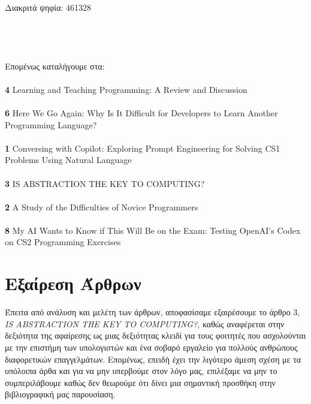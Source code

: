 \documentclass{report}
\begin{document}
\\Διακριτά ψηφία:  461328 \\\\
\\\\\\Επομένως καταλήγουμε στα:\\\\
\textbf4 Learning and Teaching Programming: A Review and Discussion  \\\\
\textbf6  Here We Go Again: Why Is It Difficult for Developers to Learn Another Programming Language?  \\ \\
\textbf1  Conversing with Copilot: Exploring Prompt Engineering for Solving CS1 Problems Using Natural Language  \\\\ 
\textbf3  IS ABSTRACTION THE KEY TO COMPUTING?  \\\\ 
\textbf2  A Study of the Difficulties of Novice Programmers  \\\\
\textbf8  My AI Wants to Know if This Will Be on the Exam: Testing OpenAI’s Codex on CS2 Programming Exercises  \\

\section{Εξαίρεση Άρθρων}
Έπειτα από ανάλυση και μελέτη των άρθρων, αποφασίσαμε εξαιρέσουμε το άρθρο 3, \textit{IS ABSTRACTION THE KEY
TO COMPUTING?}, καθώς αναφέρεται στην δεξιότητα της αφαίρεσης ως μιας δεξιότητας κλειδί για τους φοιτητές που ασχολούνται με την επιστήμη των υπολογιστών και ένα σοβαρό εργαλείο για πολλούς ανθρώπους διαφορετικών επαγγελμάτων. Επομένως, επειδή έχει την λιγότερο άμεση σχέση με τα υπόλοιπα άρθα και για να μην υπερβούμε στον λόγο μας, επιλέξαμε να μην το συμπεριλάβουμε καθώς δεν θεωρούμε ότι δίνει μια σημαντική προσθήκη στην βιβλιογραφική μας παρουσίαση.
\end{document}
